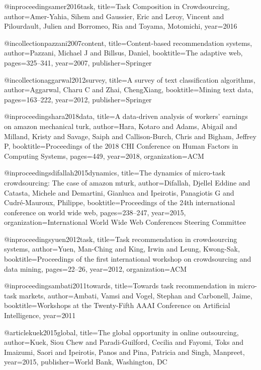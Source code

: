 
@inproceedings{amer2016task,
  title={Task Composition in Crowdsourcing},
  author={Amer-Yahia, Sihem and Gaussier, Eric and Leroy, Vincent and Pilourdault, Julien and Borromeo, Ria and Toyama, Motomichi},
  year={2016}
}


@incollection{pazzani2007content,
  title={Content-based recommendation systems},
  author={Pazzani, Michael J and Billsus, Daniel},
  booktitle={The adaptive web},
  pages={325--341},
  year={2007},
  publisher={Springer}
}

@incollection{aggarwal2012survey,
  title={A survey of text classification algorithms},
  author={Aggarwal, Charu C and Zhai, ChengXiang},
  booktitle={Mining text data},
  pages={163--222},
  year={2012},
  publisher={Springer}
}

@inproceedings{hara2018data,
  title={A data-driven analysis of workers' earnings on amazon mechanical turk},
  author={Hara, Kotaro and Adams, Abigail and Milland, Kristy and Savage, Saiph and Callison-Burch, Chris and Bigham, Jeffrey P},
  booktitle={Proceedings of the 2018 CHI Conference on Human Factors in Computing Systems},
  pages={449},
  year={2018},
  organization={ACM}
}

@inproceedings{difallah2015dynamics,
  title={The dynamics of micro-task crowdsourcing: The case of amazon mturk},
  author={Difallah, Djellel Eddine and Catasta, Michele and Demartini, Gianluca and Ipeirotis, Panagiotis G and Cudr{\'e}-Mauroux, Philippe},
  booktitle={Proceedings of the 24th international conference on world wide web},
  pages={238--247},
  year={2015},
  organization={International World Wide Web Conferences Steering Committee}
}

@inproceedings{yuen2012task,
  title={Task recommendation in crowdsourcing systems},
  author={Yuen, Man-Ching and King, Irwin and Leung, Kwong-Sak},
  booktitle={Proceedings of the first international workshop on crowdsourcing and data mining},
  pages={22--26},
  year={2012},
  organization={ACM}
}

@inproceedings{ambati2011towards,
  title={Towards task recommendation in micro-task markets},
  author={Ambati, Vamsi and Vogel, Stephan and Carbonell, Jaime},
  booktitle={Workshops at the Twenty-Fifth AAAI Conference on Artificial Intelligence},
  year={2011}
}

@article{kuek2015global,
  title={The global opportunity in online outsourcing},
  author={Kuek, Siou Chew and Paradi-Guilford, Cecilia and Fayomi, Toks and Imaizumi, Saori and Ipeirotis, Panos and Pina, Patricia and Singh, Manpreet},
  year={2015},
  publisher={World Bank, Washington, DC}
}